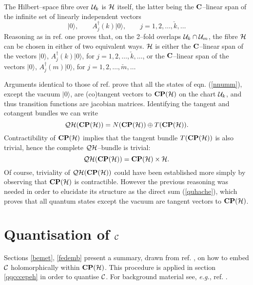 \documentclass[a4paper,a4paper]{article}
\begin{document}
The Hilbert--space fibre over ${\cal U}_k$ is ${\cal H}$ itself, the latter being the 
${\bf C}$--linear span of the infinite set of linearly independent vectors 
\begin{equation}
\vert 0\rangle,\qquad A^{\dagger}_j(k)\vert 0\rangle,\qquad 
j=1, 2, \ldots, \check k, \ldots
\label{nnumm}
\end{equation}
Reasoning as in ref. \cite{PQM} one proves 
that, on the 2--fold overlaps ${\cal U}_k\cap {\cal U}_m$, the fibre ${\cal H}$ can be chosen 
in either of two equivalent ways.  ${\cal H}$ is either the ${\bf C}$--linear span of the vectors 
$\vert 0\rangle$, $A^{\dagger}_j(k)\vert 0\rangle$, for
$j=1, 2, \ldots, \check k, \ldots$, or the ${\bf C}$--linear span of the vectors $\vert 0\rangle$, 
$A^{\dagger}_j(m)\vert 0\rangle$, for $j=1, 2, \ldots, \check 
m, \ldots$

Arguments identical to those of ref. \cite{PQM} prove that all the states of eqn. (\ref{nnumm}), 
except the vacuum $\vert 0\rangle$, are (co)tangent vectors to ${\bf CP}({\cal H})$ on the 
chart ${\cal U}_k$, and thus transition functions are jacobian matrices. 
Identifying the tangent and cotangent bundles we can write
\begin{equation}
{\cal QH}({\bf CP}({\cal H})) = N({\bf CP}({\cal H})) \oplus T({\bf CP}({\cal H})).
\label{quhache}
\end{equation}
Contractibility of ${\bf CP}({\cal H})$ implies that the tangent bundle 
$T({\bf CP}({\cal H}))$ is also trivial, hence the complete ${\cal 
QH}$--bundle is trivial:
\begin{equation}
{\cal QH}({\bf CP}({\cal H})) = {\bf CP}({\cal H})\times {\cal H}.
\label{tuttr}
\end{equation}
Of course, triviality of ${\cal QH}({\bf CP}({\cal H}))$ could have been established 
more simply by observing that ${\bf CP}({\cal H})$ is contractible. However the previous 
reasoning was needed in order to elucidate its structure as the direct sum (\ref{quhache}), 
which proves that all quantum states except the vacuum are tangent vectors to ${\bf CP}({\cal H})$.


\section{Quantisation of ${\cal C}$}\label{imbbdd}


Sections \ref{bemet}, \ref{fedemb} present a summary, drawn from ref. \cite{CPINF}, 
on how to embed ${\cal C}$ holomorphically within ${\bf CP}({\cal H})$. 
This procedure is applied in section \ref{qqcccepeh} in order to quantise ${\cal C}$.
For background material see, {\it e.g.}, ref. \cite{PERELOMOV}.
\end{document}
